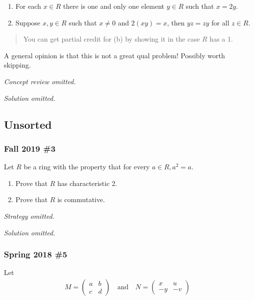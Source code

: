 \begin{enumerate}
\def\labelenumi{\alph{enumi}.}
\item
  For each \(x\in R\) there is one and only one element \(y\in R\) such
  that \(x = 2y\).
\item
  Suppose \(x,y\in R\) such that \(x\neq 0\) and \(2(xy) = x\), then
  \(yz = zy\) for all \(z\in R\).
\end{enumerate}

\begin{quote}
You can get partial credit for (b) by showing it in the case \(R\) has a
1.
\end{quote}

\begin{remark}

A general opinion is that this is not a great qual problem! Possibly
worth skipping.

\end{remark}

\emph{Concept review omitted.}

\emph{Solution omitted.}

\hypertarget{unsorted}{%
\subsection{Unsorted}\label{unsorted}}

\hypertarget{fall-2019-3}{%
\subsubsection{Fall 2019 \#3}\label{fall-2019-3}}

Let \(R\) be a ring with the property that for every
\(a \in R, a^2 = a\).

\begin{enumerate}
\def\labelenumi{\alph{enumi}.}
\item
  Prove that \(R\) has characteristic 2.
\item
  Prove that \(R\) is commutative.
\end{enumerate}

\emph{Strategy omitted.}

\emph{Solution omitted.}

\hypertarget{spring-2018-5}{%
\subsubsection{Spring 2018 \#5}\label{spring-2018-5}}

Let
\begin{align*}
M=\left(\begin{array}{ll}{a} & {b} \\ {c} & {d}\end{array}\right)
\quad \text{and} \quad 
N=\left(\begin{array}{cc}{x} & {u} \\ {-y} & {-v}\end{array}\right)
\end{align*}

